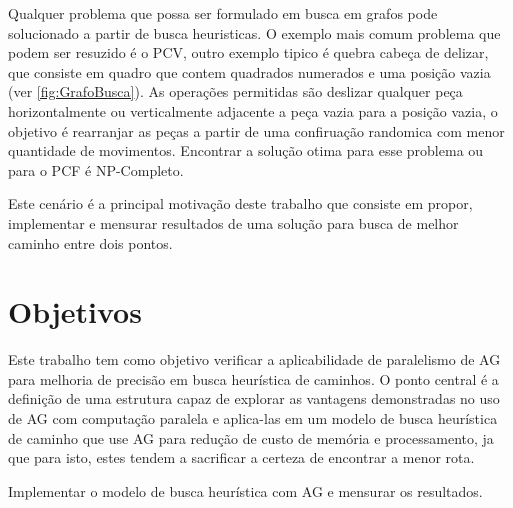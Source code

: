 Qualquer problema que possa ser formulado em busca em grafos pode solucionado a partir de busca heuristicas. O exemplo mais comum problema que podem ser resuzido é o PCV, outro exemplo tipico é quebra cabeça de delizar, que consiste em quadro que contem quadrados numerados e uma posição vazia (ver \ref{fig:GrafoBusca}). As operações permitidas são deslizar qualquer peça horizontalmente ou verticalmente adjacente a peça vazia para a posição vazia, o objetivo é rearranjar as peças a partir de uma confiruação randomica com menor quantidade de movimentos. Encontrar a solução otima para esse problema ou para o PCF é NP-Completo. \cite{Kar72} \cite{RatnerW86}

\begin{minipage}{\linewidth}
    \label{fig:slide-puzzle}
\end{minipage}

Este cenário é a principal motivação deste trabalho que consiste em propor, implementar e mensurar resultados de uma solução para busca de melhor caminho entre dois pontos.

\section{Objetivos}

Este trabalho tem como objetivo verificar a aplicabilidade de paralelismo de AG para melhoria de precisão em busca heurística de caminhos. O ponto central é a definição de uma estrutura capaz de explorar as vantagens demonstradas no uso de AG com computação paralela e aplica-las em um modelo de busca heurística de caminho que use AG para redução de custo de memória e processamento, ja que para isto, estes tendem a sacrificar a certeza de encontrar a menor rota. 

Implementar o modelo de busca heurística com AG e mensurar os resultados. 


